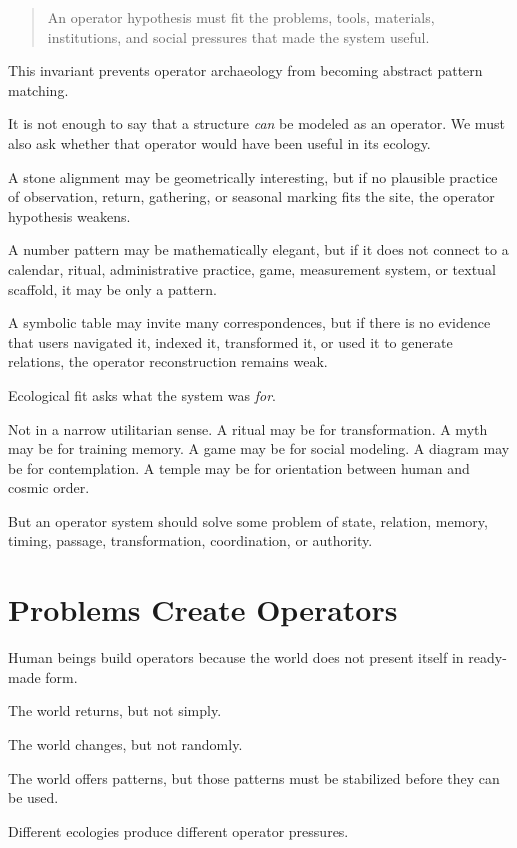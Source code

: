 \documentclass[11pt]{book}
\begin{document}
\begin{quote}
An operator hypothesis must fit the problems, tools, materials, institutions, and social pressures that made the system useful.
\end{quote}

This invariant prevents operator archaeology from becoming abstract pattern matching.

It is not enough to say that a structure \emph{can} be modeled as an operator. We must also ask whether that operator would have been useful in its ecology.

A stone alignment may be geometrically interesting, but if no plausible practice of observation, return, gathering, or seasonal marking fits the site, the operator hypothesis weakens.

A number pattern may be mathematically elegant, but if it does not connect to a calendar, ritual, administrative practice, game, measurement system, or textual scaffold, it may be only a pattern.

A symbolic table may invite many correspondences, but if there is no evidence that users navigated it, indexed it, transformed it, or used it to generate relations, the operator reconstruction remains weak.

Ecological fit asks what the system was \emph{for}.

Not in a narrow utilitarian sense. A ritual may be for transformation. A myth may be for training memory. A game may be for social modeling. A diagram may be for contemplation. A temple may be for orientation between human and cosmic order.

But an operator system should solve some problem of state, relation, memory, timing, passage, transformation, coordination, or authority.

\section{Problems Create Operators}

Human beings build operators because the world does not present itself in ready-made form.

The world returns, but not simply.

The world changes, but not randomly.

The world offers patterns, but those patterns must be stabilized before they can be used.

Different ecologies produce different operator pressures.
\end{document}
